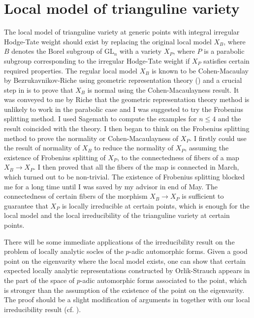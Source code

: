 \documentclass{amsart}
\newcommand{\GL}{\text{GL}}
\numberwithin{equation}{section}
\begin{document}
\section{Local model of trianguline variety}
The local model of trianguline variety at generic points with integral irregular Hodge-Tate weight should exist by replacing the original local model $X_B$, where $B$ denotes the Borel subgroup of $\GL_n$ with a variety $X_P$, where $P$ is a parabolic subgroup corresponding to the irregular Hodge-Tate weight if $X_P$ satisfies certain required properties. The regular local model $X_{B}$ is known to be Cohen-Macaulay by Bezrukavnikov-Riche using geometric representation theory (\cite{riche2008geometric}) and a crucial step in \cite{breuil2019local} is to prove that $X_B$ is normal using the Cohen-Macaulayness result. It was conveyed to me by Riche that the geometric representation theory method is unlikely to work in the parabolic case and I was suggested to try the Frobenius splitting method. I used Sagemath to compute the examples for $n\leq 4$ and the result coincided with the theory. I then began to think on the Frobenius splitting method to prove the normality or Cohen-Macaulayness of $X_P$. I firstly could use the result of normality of $X_B$ to reduce the normality of $X_P$, assuming the existence of Frobenius splitting of $X_P$, to the connectedness of fibers of a map $X_B\rightarrow X_P$. I then proved that all the fibers of the map is connected in March, which turned out to be non-trivial. The existence of Frobenius splitting blocked me for a long time until I was saved by my advisor in end of May. The connectedness of certain fibers of the morphism $X_B\rightarrow X_P$ is sufficient to guarantee that $X_P$ is locally irreducible at certain points, which is enough for the local model and the local irreducibility of the trianguline variety at certain points.\par
There will be some immediate applications of the irreducibility result on the problem of locally analytic socles of the $p$-adic automorphic forms. Given a good point on the eigenvarity where the local model exists, one can show that certain expected locally analytic representations constructed by Orlik-Strauch appears in the part of the space of $p$-adic automorphic forms associated to the point, which is stronger than the assumption of the existence of the point on the eigenvarity. The proof should be a slight modification of arguments in \cite{breuil2019local} together with our local irreducibility result (cf. \cite{Wu2020unibranch}).\par
\end{document}

